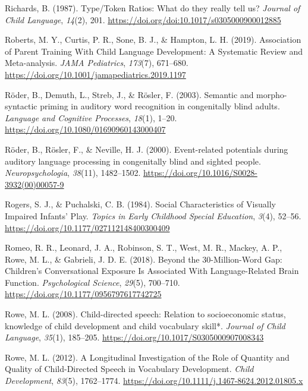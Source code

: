 \documentclass[
  man]{apa6}
\newlength{\cslhangindent}
\newlength{\cslentryspacingunit} %
\newenvironment{CSLReferences}[2] %
 {%
  \setlength{\parindent}{0pt}
  \ifodd #1
  \let\oldpar\par
  \def\par{\hangindent=\cslhangindent\oldpar}
  \fi
  \setlength{\parskip}{#2\cslentryspacingunit}
 }%
 {}
\begin{document}
\begin{CSLReferences}{1}{0}
\leavevmode{}%
Richards, B. (1987). Type/{Token Ratios}: What do they really tell us? \emph{Journal of Child Language}, \emph{14}(2), 201. \url{https://doi.org/doi:10.1017/s0305000900012885}

\leavevmode{}%
Roberts, M. Y., Curtis, P. R., Sone, B. J., \& Hampton, L. H. (2019). Association of {Parent Training With Child Language Development}: {A Systematic Review} and {Meta-analysis}. \emph{JAMA Pediatrics}, \emph{173}(7), 671--680. \url{https://doi.org/10.1001/jamapediatrics.2019.1197}

\leavevmode{}%
Röder, B., Demuth, L., Streb, J., \& Rösler, F. (2003). Semantic and morpho-syntactic priming in auditory word recognition in congenitally blind adults. \emph{Language and Cognitive Processes}, \emph{18}(1), 1--20. \url{https://doi.org/10.1080/01690960143000407}

\leavevmode{}%
Röder, B., Rösler, F., \& Neville, H. J. (2000). Event-related potentials during auditory language processing in congenitally blind and sighted people. \emph{Neuropsychologia}, \emph{38}(11), 1482--1502. \url{https://doi.org/10.1016/S0028-3932(00)00057-9}

\leavevmode{}%
Rogers, S. J., \& Puchalski, C. B. (1984). Social {Characteristics} of {Visually Impaired Infants}' {Play}. \emph{Topics in Early Childhood Special Education}, \emph{3}(4), 52--56. \url{https://doi.org/10.1177/027112148400300409}

\leavevmode{}%
Romeo, R. R., Leonard, J. A., Robinson, S. T., West, M. R., Mackey, A. P., Rowe, M. L., \& Gabrieli, J. D. E. (2018). Beyond the 30-{Million-Word Gap}: {Children}'s {Conversational Exposure Is Associated With Language-Related Brain Function}. \emph{Psychological Science}, \emph{29}(5), 700--710. \url{https://doi.org/10.1177/0956797617742725}

\leavevmode{}%
Rowe, M. L. (2008). Child-directed speech: Relation to socioeconomic status, knowledge of child development and child vocabulary skill*. \emph{Journal of Child Language}, \emph{35}(1), 185--205. \url{https://doi.org/10.1017/S0305000907008343}

\leavevmode{}%
Rowe, M. L. (2012). A {Longitudinal Investigation} of the {Role} of {Quantity} and {Quality} of {Child-Directed Speech} in {Vocabulary Development}. \emph{Child Development}, \emph{83}(5), 1762--1774. \url{https://doi.org/10.1111/j.1467-8624.2012.01805.x}


\end{CSLReferences}
\end{document}
